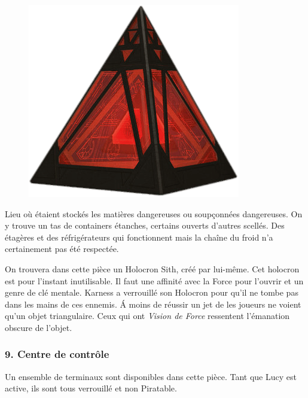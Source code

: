 \begin{figure}
    \vspace{-5\baselineskip}
    \centering\includegraphics[width=\linewidth]{_img/dos-au-muur/holocron-sith.png}
    \vspace{-2\baselineskip} 
\end{figure}
Lieu où étaient stockés les matières dangereuses ou soupçonnées dangereuses. On y trouve un tas de containers étanches, certains ouverts d’autres scellés. Des étagères et des réfrigérateurs qui fonctionnent mais la chaîne du froid n’a certainement pas été respectée.

On trouvera dans cette pièce un Holocron Sith, créé par  lui-même. Cet holocron est pour l’instant inutilisable. Il faut une affinité avec la Force pour l’ouvrir et un genre de clé mentale. Karness a verrouillé son Holocron pour qu’il ne tombe pas dans les mains de ces ennemis. \'A moins de réussir un jet de  les joueurs ne voient qu’un objet triangulaire. Ceux qui ont \textit{Vision de Force} ressentent l’émanation obscure de l’objet.

\subsubsection{9. Centre de contrôle}
Un ensemble de terminaux sont disponibles dans cette pièce. Tant que Lucy est active, ils sont tous verrouillé et non Piratable.

